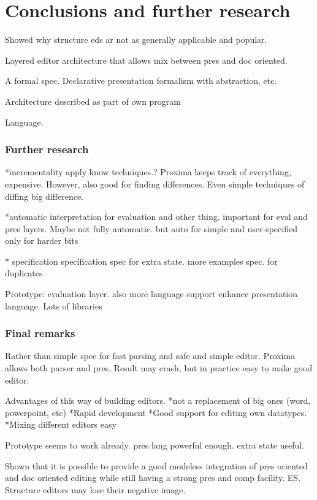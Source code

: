 \chapter{Conclusions and further research}
\label{chap:conclusions}


Showed why structure eds ar not as generally applicable and popular.

Layered editor architecture that allows mix between pres and doc oriented.

A formal spec. Declarative presentation formalism with abstraction, etc.

Architecture described as part of own program

Language. 


\subsection{Further research}

*incrementality
apply know techniques.?
Proxima keeps track of everything, expensive. However, also good for finding differences. Even simple techniques of diffing big difference.

*automatic interpretation for evaluation and other thing.
important for eval and pres layers. Maybe not fully automatic. but auto for simple and user-specified only for harder bits

* specification
specification
spec for extra state. more examples
spec. for duplicates

Prototype:
evaluation layer. also more language support
enhance presentation language.
Lots of libraries

\subsection{Final remarks}

% 
Rather than simple spec for fast parsing and safe and simple editor. Proxima allows both parser and pres. Result may crash, but in practice easy to make good editor. 

Advantages of this way of building editors.
*not a replacement of big ones (word, powerpoint, etc)
*Rapid development
*Good support for editing own datatypes.
*Mixing different editors easy



Prototype seems to work already. pres lang powerful enough. extra state useful. 



Shown that it is possible to provide a good modeless integration of pres oriented and doc oriented editing while still having a strong pres and comp facility. ES. Structure editors may lose their negative image. 

